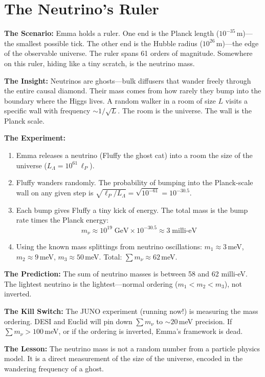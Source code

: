 \documentclass[11pt, a4paper, openany]{book}
\newcommand{\lP}{\ell_P}
\begin{document}
\section{The Neutrino's Ruler}
\begin{thoughtexp}
\textbf{The Scenario:} Emma holds a ruler. One end is the Planck length ($10^{-35}$\,m)---the smallest possible tick. The other end is the Hubble radius ($10^{26}$\,m)---the edge of the observable universe. The ruler spans 61 orders of magnitude. Somewhere on this ruler, hiding like a tiny scratch, is the neutrino mass.

\textbf{The Insight:} Neutrinos are ghosts---bulk diffusers that wander freely through the entire causal diamond. Their mass comes from how rarely they bump into the boundary where the Higgs lives. A random walker in a room of size $L$ visits a specific wall with frequency $\sim 1/\sqrt{L}$. The room is the universe. The wall is the Planck scale.

\textbf{The Experiment:}
\begin{enumerate}
  \item Emma releases a neutrino (Fluffy the ghost cat) into a room the size of the universe ($L_\Lambda = 10^{61}\,\lP$).
  \item Fluffy wanders randomly. The probability of bumping into the Planck-scale wall on any given step is $\sqrt{\lP/L_\Lambda} = \sqrt{10^{-61}} = 10^{-30.5}$.
  \item Each bump gives Fluffy a tiny kick of energy. The total mass is the bump rate times the Planck energy:
  \[
    m_\nu \approx 10^{19}\;\text{GeV} \times 10^{-30.5} \approx 3\;\text{milli-eV}
  \]
  \item Using the known mass splittings from neutrino oscillations: $m_1 \approx 3$\,meV, $m_2 \approx 9$\,meV, $m_3 \approx 50$\,meV. Total: $\sum m_\nu \approx 62$\,meV.
\end{enumerate}

\textbf{The Prediction:} The sum of neutrino masses is between 58 and 62 milli-eV. The lightest neutrino is the lightest---normal ordering ($m_1 < m_2 < m_3$), not inverted.

\textbf{The Kill Switch:} The JUNO experiment (running now!) is measuring the mass ordering. DESI and Euclid will pin down $\sum m_\nu$ to $\sim 20$\,meV precision. If $\sum m_\nu > 100$\,meV, or if the ordering is inverted, Emma's framework is dead.

\textbf{The Lesson:} The neutrino mass is not a random number from a particle physics model. It is a direct measurement of the size of the universe, encoded in the wandering frequency of a ghost.
\end{thoughtexp}
\end{document}
